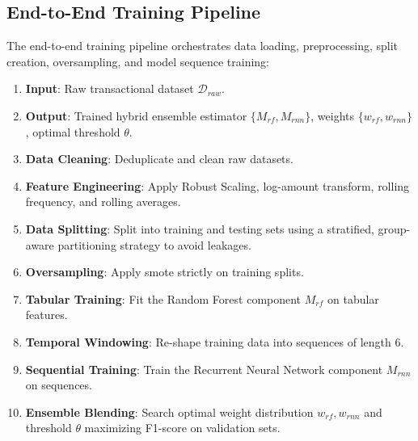 \subsection{End-to-End Training Pipeline}
The end-to-end training pipeline orchestrates data loading, preprocessing, split creation, oversampling, and model sequence training:
\begin{enumerate}
    \item \textbf{Input}: Raw transactional dataset $\mathcal{D}_{raw}$.
    \item \textbf{Output}: Trained hybrid ensemble estimator $\{M_{rf}, M_{rnn}\}$, weights $\{w_{rf}, w_{rnn}\}$, optimal threshold $\theta$.
    \item \textbf{Data Cleaning}: Deduplicate and clean raw datasets.
    \item \textbf{Feature Engineering}: Apply Robust Scaling, log-amount transform, rolling frequency, and rolling averages.
    \item \textbf{Data Splitting}: Split into training and testing sets using a stratified, group-aware partitioning strategy to avoid leakages.
    \item \textbf{Oversampling}: Apply \gls{smote} strictly on training splits.
    \item \textbf{Tabular Training}: Fit the Random Forest component $M_{rf}$ on tabular features.
    \item \textbf{Temporal Windowing}: Re-shape training data into sequences of length 6.
    \item \textbf{Sequential Training}: Train the Recurrent Neural Network component $M_{rnn}$ on sequences.
    \item \textbf{Ensemble Blending}: Search optimal weight distribution $w_{rf}, w_{rnn}$ and threshold $\theta$ maximizing F1-score on validation sets.
\end{enumerate}

